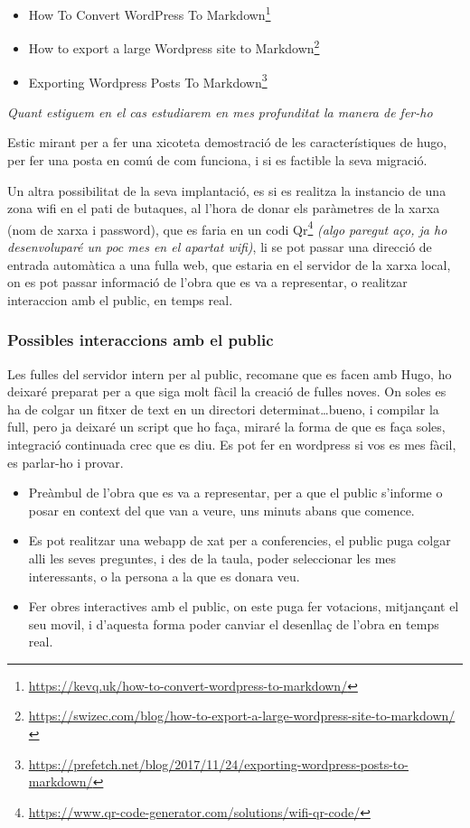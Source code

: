 \documentclass[
  10pt,
]{book}
\DeclareRobustCommand{\href}[2]{#2\footnote{\url{#1}}}
\providecommand{\tightlist}{%
  \setlength{\itemsep}{0pt}\setlength{\parskip}{0pt}}
\begin{document}
\begin{itemize}
\tightlist
\item
  \href{https://kevq.uk/how-to-convert-wordpress-to-markdown/}{How To Convert WordPress To Markdown}
\item
  \href{https://swizec.com/blog/how-to-export-a-large-wordpress-site-to-markdown/}{How to export a large Wordpress site to Markdown}
\item
  \href{https://prefetch.net/blog/2017/11/24/exporting-wordpress-posts-to-markdown/}{Exporting Wordpress Posts To Markdown}
\end{itemize}

\emph{Quant estiguem en el cas estudiarem en mes profunditat la manera de fer-ho}

Estic mirant per a fer una xicoteta demostració de les característiques de hugo, per fer una posta en comú de com funciona, i si es factible la seva migració.

Un altra possibilitat de la seva implantació, es si es realitza la instancio de una zona wifi en el pati de butaques, al l'hora de donar els paràmetres de la xarxa (nom de xarxa i password), que es faria en un codi \href{https://www.qr-code-generator.com/solutions/wifi-qr-code/}{Qr} \emph{(algo paregut aço, ja ho desenvoluparé un poc mes en el apartat wifi)}, li se pot passar una direcció de entrada automàtica a una fulla web, que estaria en el servidor de la xarxa local, on es pot passar informació de l'obra que es va a representar, o realitzar interaccion amb el public, en temps real.

\hypertarget{possibles-interaccions-amb-el-public}{%
\subsubsection{Possibles interaccions amb el public}\label{possibles-interaccions-amb-el-public}}

Les fulles del servidor intern per al public, recomane que es facen amb Hugo, ho deixaré preparat per a que siga molt fàcil la creació de fulles noves. On soles es ha de colgar un fitxer de text en un directori determinat\ldots bueno, i compilar la full, pero ja deixaré un script que ho faça, miraré la forma de que es faça soles, integració continuada crec que es diu. Es pot fer en wordpress si vos es mes fàcil, es parlar-ho i provar.

\begin{itemize}
\item
  Preàmbul de l'obra que es va a representar, per a que el public s'informe o posar en context del que van a veure, uns minuts abans que comence.
\item
  Es pot realitzar una webapp de xat per a conferencies, el public puga colgar alli les seves preguntes, i des de la taula, poder seleccionar les mes interessants, o la persona a la que es donara veu.
\item
  Fer obres interactives amb el public, on este puga fer votacions, mitjançant el seu movil, i d'aquesta forma poder canviar el desenllaç de l'obra en temps real.
\end{itemize}
\end{document}
